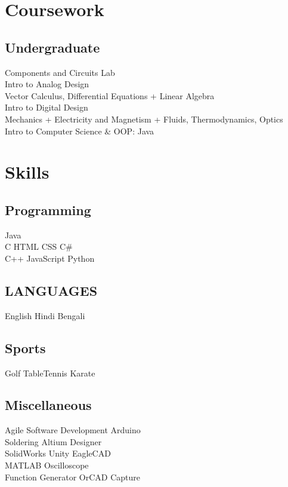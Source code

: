 \documentclass[]{deedy-resume-openfont}
\begin{document}
\begin{minipage}[t]{0.31\textwidth}
\sectionsep

\section{Coursework}

\subsection{Undergraduate}
\textbullet Components and Circuits Lab \\
\textbullet Intro to Analog Design \\
\textbullet Vector Calculus, Differential Equations + Linear Algebra\\
\textbullet Intro to Digital Design \\
\textbullet Mechanics + Electricity and Magnetism + Fluids, Thermodynamics, Optics \\
\textbullet{} Intro to Computer Science \& OOP: Java
\sectionsep


\section{Skills}
\subsection{Programming}
Java  \\
C \textbullet{} HTML \textbullet{} CSS \textbullet{} C\# \\
C++ \textbullet{} JavaScript \textbullet{} Python 
\sectionsep
\subsection{LANGUAGES}
English \textbullet{} Hindi \textbullet{} Bengali
\sectionsep

\subsection{Sports}
 Golf \textbullet{} Table\-Tennis \textbullet{} Karate\\
\sectionsep

\subsection{Miscellaneous}
Agile Software Development \textbullet{} Arduino \\
Soldering \textbullet{} Altium Designer \\
SolidWorks \textbullet{} Unity \textbullet{} EagleCAD \\
MATLAB \textbullet{} Oscilloscope \\
Function Generator \textbullet{} OrCAD Capture

%
%

\end{minipage} 
\end{document}
